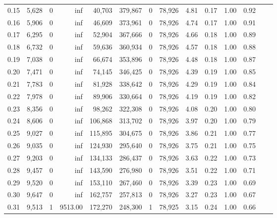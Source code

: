 \begin{tabular}{rrrrrrrrrrrrrr}
0.15 &  5,628 &      0 &      inf &   40,703 &  379,867 &       0 &  78,926 &  4.81 &  0.17 &  1.00 &      0.92 \\
0.16 &  5,906 &      0 &      inf &   46,609 &  373,961 &       0 &  78,926 &  4.74 &  0.17 &  1.00 &      0.91 \\
0.17 &  6,295 &      0 &      inf &   52,904 &  367,666 &       0 &  78,926 &  4.66 &  0.18 &  1.00 &      0.89 \\
0.18 &  6,732 &      0 &      inf &   59,636 &  360,934 &       0 &  78,926 &  4.57 &  0.18 &  1.00 &      0.88 \\
0.19 &  7,038 &      0 &      inf &   66,674 &  353,896 &       0 &  78,926 &  4.48 &  0.18 &  1.00 &      0.87 \\
0.20 &  7,471 &      0 &      inf &   74,145 &  346,425 &       0 &  78,926 &  4.39 &  0.19 &  1.00 &      0.85 \\
0.21 &  7,783 &      0 &      inf &   81,928 &  338,642 &       0 &  78,926 &  4.29 &  0.19 &  1.00 &      0.84 \\
0.22 &  7,978 &      0 &      inf &   89,906 &  330,664 &       0 &  78,926 &  4.19 &  0.19 &  1.00 &      0.82 \\
0.23 &  8,356 &      0 &      inf &   98,262 &  322,308 &       0 &  78,926 &  4.08 &  0.20 &  1.00 &      0.80 \\
0.24 &  8,606 &      0 &      inf &  106,868 &  313,702 &       0 &  78,926 &  3.97 &  0.20 &  1.00 &      0.79 \\
0.25 &  9,027 &      0 &      inf &  115,895 &  304,675 &       0 &  78,926 &  3.86 &  0.21 &  1.00 &      0.77 \\
0.26 &  9,035 &      0 &      inf &  124,930 &  295,640 &       0 &  78,926 &  3.75 &  0.21 &  1.00 &      0.75 \\
0.27 &  9,203 &      0 &      inf &  134,133 &  286,437 &       0 &  78,926 &  3.63 &  0.22 &  1.00 &      0.73 \\
0.28 &  9,457 &      0 &      inf &  143,590 &  276,980 &       0 &  78,926 &  3.51 &  0.22 &  1.00 &      0.71 \\
0.29 &  9,520 &      0 &      inf &  153,110 &  267,460 &       0 &  78,926 &  3.39 &  0.23 &  1.00 &      0.69 \\
0.30 &  9,647 &      0 &      inf &  162,757 &  257,813 &       0 &  78,926 &  3.27 &  0.23 &  1.00 &      0.67 \\
0.31 &  9,513 &      1 &  9513.00 &  172,270 &  248,300 &       1 &  78,925 &  3.15 &  0.24 &  1.00 &      0.66 \\

\end{tabular}
